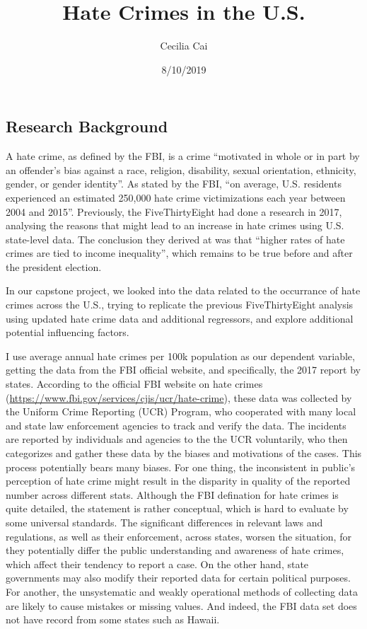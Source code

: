\documentclass[]{article}
\title{Hate Crimes in the U.S.}
\author{Cecilia Cai}
\date{8/10/2019}
\begin{document}
\maketitle

\hypertarget{research-background}{%
\subsection{Research Background}\label{research-background}}

A hate crime, as defined by the FBI, is a crime ``motivated in whole or
in part by an offender's bias against a race, religion, disability,
sexual orientation, ethnicity, gender, or gender identity''. As stated
by the FBI, ``on average, U.S. residents experienced an estimated
250,000 hate crime victimizations each year between 2004 and 2015''.
Previously, the FiveThirtyEight had done a research in 2017, analysing
the reasons that might lead to an increase in hate crimes using U.S.
state-level data. The conclusion they derived at was that ``higher rates
of hate crimes are tied to income inequality'', which remains to be true
before and after the president election.

In our capstone project, we looked into the data related to the
occurrance of hate crimes across the U.S., trying to replicate the
previous FiveThirtyEight analysis using updated hate crime data and
additional regressors, and explore additional potential influencing
factors.

I use average annual hate crimes per 100k population as our dependent
variable, getting the data from the FBI official website, and
specifically, the 2017 report by states. According to the official FBI
website on hate crimes
(\url{https://www.fbi.gov/services/cjis/ucr/hate-crime}), these data was
collected by the Uniform Crime Reporting (UCR) Program, who cooperated
with many local and state law enforcement agencies to track and verify
the data. The incidents are reported by individuals and agencies to the
the UCR voluntarily, who then categorizes and gather these data by the
biases and motivations of the cases. This process potentially bears many
biases. For one thing, the inconsistent in public's perception of hate
crime might result in the disparity in quality of the reported number
across different stats. Although the FBI defination for hate crimes is
quite detailed, the statement is rather conceptual, which is hard to
evaluate by some universal standards. The significant differences in
relevant laws and regulations, as well as their enforcement, across
states, worsen the situation, for they potentially differ the public
understanding and awareness of hate crimes, which affect their tendency
to report a case. On the other hand, state governments may also modify
their reported data for certain political purposes. For another, the
unsystematic and weakly operational methods of collecting data are
likely to cause mistakes or missing values. And indeed, the FBI data set
does not have record from some states such as Hawaii.
\end{document}
